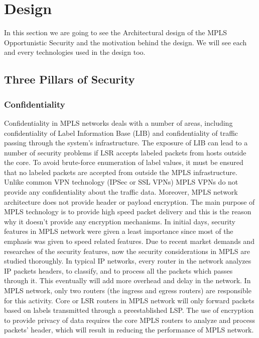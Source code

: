 \chapter{Design}

In this section we are going to see the Architectural design of the MPLS Opportunistic Security and the motivation behind the design. We will see each and every technologies used in the design too.

\section{Three Pillars of Security}

\subsection{Confidentiality}

Confidentiality in MPLS networks
deals with a number of areas, including confidentiality of
Label Information Base (LIB) and confidentiality of
traffic passing through the system's infrastructure. The exposure
of LIB can lead to a number of security problems if LSR
accepts labeled packets from hosts outside the core. To
avoid brute-force enumeration of label values, it
must be ensured that no labeled packets are accepted
from outside the MPLS infrastructure. Unlike common VPN technology (IPSec or SSL VPNs) MPLS VPNs do not provide any confidentiality about the traffic data.
Moreover, MPLS network architecture does
not provide header or payload encryption. The main purpose of MPLS technology is to provide high speed
packet delivery and this is the reason why it doesn't provide any encryption mechanisms. In initial days, security features in MPLS network were given a least importance since most of the emphasis was given to speed related features. Due to recent market demands and researches of the security features, now the security considerations in MPLS are studied thoroughly. In typical IP networks,
every router in the network analyzes IP
packets headers, to classify, and to process all the
packets  which passes through it. This eventually will add more
overhead and delay in the network. In
MPLS network, only two routers (the ingress and
egress routers) are responsible for this activity. Core or
LSR routers in MPLS network will only forward
packets based on labels transmitted through a preestablished
LSP. The use of encryption to provide
privacy of data requires the core MPLS routers to
analyze and process packets’ header, which will result
in reducing the performance of MPLS network.

